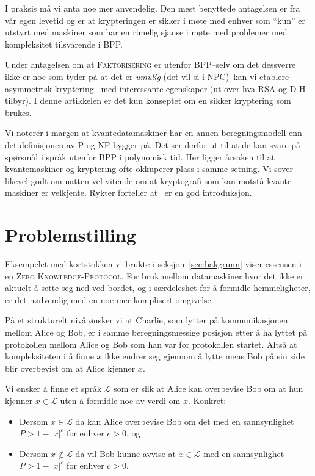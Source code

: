 \documentclass[a4paper, parskip=half]{scrartcl}
\theoremstyle{definition}
\begin{document}
I praksis må vi anta noe mer anvendelig.  Den mest benyttede antagelsen
er fra vår egen levetid og er at krypteringen er sikker i møte med
enhver som ``kun'' er utstyrt med  maskiner som har en rimelig sjanse
i møte med problemer med kompleksitet tilsvarende i \textsf{BPP}.

Under antagelsen om at \textsc{Faktorisering} er utenfor
\textsf{BPP}--selv om det dessverre ikke er noe som tyder på at det er
\emph{umulig} (det vil si i \textsf{NPC})--kan vi etablere asymmetrisk
kryptering~\cite{Goldwasser1982probabilistic,Goldwasser1984Probabilistic}
med interessante egenskaper (ut over hva \textsc{RSA} og \textsc{D-H}
tilbyr).  I denne artikkelen er det kun konseptet om en sikker
kryptering som brukes.

Vi noterer i margen at kvantedatamaskiner har en annen
beregningsmodell enn det definisjonen av \textsf{P} og \textsf{NP}
bygger på.  Det ser 
derfor ut til at de kan svare på spørsmål i språk utenfor
\textsf{BPP} i polynomisk tid.  Her ligger årsaken til at
kvantemaskiner og kryptering ofte okkuperer plass i samme setning.  Vi
sover likevel godt om natten vel vitende om at kryptografi som kan
motstå kvante-maskiner er velkjente.  Rykter forteller
at~\cite{stinson2026primer} er en god introduksjon.


%
%
\section{Problemstilling}

Eksempelet med kortstokken vi brukte i seksjon~\ref{sec:bakgrunn}
viser essensen i en \textsc{Zero Knowledge-Protocol}.
For bruk mellom datamaskiner hvor det ikke er aktuelt å sette seg ned
ved bordet, og i særdeleshet for å formidle hemmeligheter, er det
nødvendig med en noe mer komplisert omgivelse

På et strukturelt nivå ønsker vi at Charlie, som lytter på
kommunikasjonen mellom Alice og Bob, er i samme beregningsmessige
posisjon etter å ha lyttet på protokollen mellom Alice og Bob som han
var før protokollen startet.  Altså at kompleksiteten i å finne $x$
ikke endrer seg gjennom å lytte mens Bob på sin side blir overbevist
om at Alice kjenner $x$.

Vi ønsker å finne et språk $\mathcal{L}$ som er slik at Alice kan
overbevise Bob om at hun kjenner $x \in \mathcal{L}$ uten å formidle
noe av  verdi om $x$.  Konkret:
\begin{itemize}
\item Dersom $x \in \mathcal{L}$ da kan Alice overbevise Bob om det
  med en sannsynlighet $P > 1-{\lvert x \rvert}^c$ for enhver $c>0$,
  og
\item Dersom $x \not\in \mathcal{L}$ da vil Bob kunne avvise at $x \in
  \mathcal{L}$ med en sannsynlighet $P > 1-{\lvert x \rvert}^c$ for
  enhver $c>0$.
\end{itemize}
\end{document}
